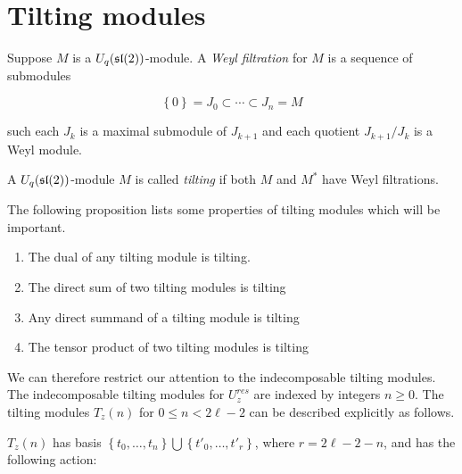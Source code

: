 \section{Tilting modules} 


\begin{defn}
    Suppose $M$ is a $U_q(\mathfrak{sl}(2))$-module. A \emph{Weyl filtration} for $M$
    is a sequence of submodules 

    \begin{equation}
        \left\{ 0 \right\} = J_0 \subset \cdots \subset J_n = M
    \end{equation}

    such each $J_k$ is a maximal submodule of $J_{k+1}$ and each quotient $J_{k+1}/J_k$ is a Weyl module. 
\end{defn}

\begin{defn}
    A $U_q(\mathfrak{sl}(2))$-module $M$ is called \emph{tilting} if both $M$ and $M^*$ have Weyl filtrations.
\end{defn}

The following proposition lists some properties of tilting modules which will
be important.

\begin{prop}
\begin{enumerate}
    \renewcommand{\labelenumi}{\roman{enumi})}
    \item The dual of any tilting module is tilting.
    \item The direct sum of two tilting modules is tilting
    \item Any direct summand of a tilting module is tilting
    \item The tensor product of two tilting modules is tilting
\end{enumerate}
\end{prop}

We can therefore restrict our attention to the indecomposable tilting modules.
The indecomposable tilting modules for $U_z^{res}$ are indexed by integers $n
\geq 0$. The tilting modules $T_z(n)$ for $0 \leq n < 2\ell - 2$ can be
described explicitly as follows.

$T_z(n)$ has basis $\left\{ t_0, \ldots, t_n \right\} \bigcup \left\{ t'_0,
    \ldots, t'_{r} \right\}$, where $r = 2\ell - 2 - n$, and has the following
    action:

